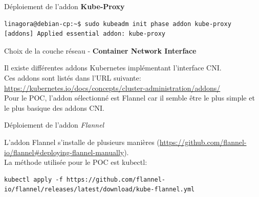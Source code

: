 
\begin{frame}[fragile]{Déploiement de l'addon \textbf{Kube-Proxy}}

\begin{tiny}
\begin{Verbatim}[commandchars=\\\{\}]
linagora@debian-cp:~$ sudo kubeadm init phase addon kube-proxy
[addons] Applied essential addon: kube-proxy
\end{Verbatim}
\end{tiny}

\end{frame}


\begin{frame}[fragile]{Choix de la couche réseau - \textbf{Container Network Interface}}

   Il existe différentes addons Kubernetes implémentant l'interface CNI.\\
   Ces addons sont listés dans l'URL suivante: \url{https://kubernetes.io/docs/concepts/cluster-administration/addons/}\\
   Pour le POC, l'addon sélectionné est Flannel car il semble être le plus simple et le plus basique des addons CNI.\\

\end{frame}


\begin{frame}[fragile]{Déploiement de l'addon \textit{Flannel}}

   L'addon Flannel s'installe de plusieurs manières (\url{https://github.com/flannel-io/flannel#deploying-flannel-manually}).\\
   La méthode utilisée pour le POC est kubectl:

\begin{tiny}
\begin{Verbatim}[commandchars=\\\{\}]
kubectl apply -f https://github.com/flannel-io/flannel/releases/latest/download/kube-flannel.yml
\end{Verbatim}
\end{tiny}

\end{frame}

